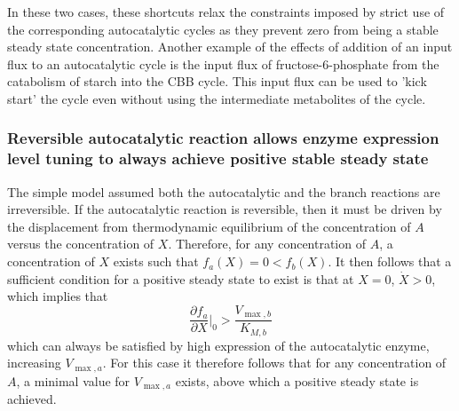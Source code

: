     \iftoggle{elifesubmission} {
  Interestingly, we find that in the two autocatalytic cycles shown in Figure \ref{fig:realautocatal}-figure supplements 1 and 2, reactions that generate direct input flux into the cycle exist.
  In the ribose-5P assimilating autocatalytic cycle (Figure \ref{fig:realautocatal}-figure supplement 1), the rpi reaction serves as a shortcut, allowing input flux directly from ribose-5P into the cycle.
  In the glycerone-phosphate assimilating cycle (Figure \ref{fig:realautocatal}-figure supplement 2), the tpi reaction similarly serves as such a shortcut.} {
  Interestingly, we find that in the two autocatalytic cycles shown in figures \ref{fig:extrasamps1} and \ref{fig:extrasamps2}, reactions that generate direct input flux into the cycle exist.
  In the ribose-5P assimilating autocatalytic cycle (Figure \ref{fig:extrasamps1}), the rpi reaction serves as a shortcut, allowing input flux directly from ribose-5P into the cycle.
  In the glycerone-phosphate assimilating cycle (Figure \ref{fig:extrasamps2}), the tpi reaction similarly serves as such a shortcut.}
  In these two cases, these shortcuts relax the constraints imposed by strict use of the corresponding autocatalytic cycles as they prevent zero from being a stable steady state concentration.
    Another example of the effects of addition of an input flux to an autocatalytic cycle is the input flux of fructose-6-phosphate from the catabolism of starch into the CBB cycle.
    This input flux can be used to 'kick start' the cycle even without using the intermediate metabolites of the cycle.

    \subsubsection{Reversible autocatalytic reaction allows enzyme expression level tuning to always achieve positive stable steady state}
    The simple model assumed both the autocatalytic and the branch reactions are irreversible.
    If the autocatalytic reaction is reversible, then it must be driven by the displacement from thermodynamic equilibrium of the concentration of $A$ versus the concentration of $X$.
    Therefore, for any concentration of $A$, a concentration of $X$ exists such that $f_a(X)=0<f_b(X)$.
    It then follows that a sufficient condition for a positive steady state to exist is that at $X=0$, $\dot{X}>0$, which implies that 
    \begin{equation*}
    \frac{\partial f_a}{\partial X}\Big\vert_{0}>\frac{V_{\max,b}}{K_{M,b}}
    \end{equation*}
    which can always be satisfied by high expression of the autocatalytic enzyme, increasing $V_{\max,a}$.
    For this case it therefore follows that for any concentration of $A$, a minimal value for $V_{\max,a}$ exists, above which a positive steady state is achieved.

